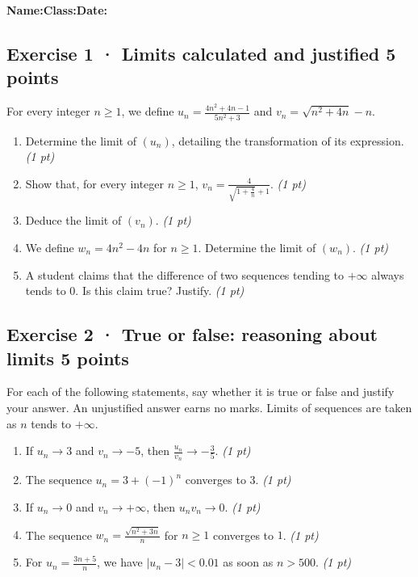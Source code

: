 \smallskip\textbf{Name:}\enspace\dotfill\quad\textbf{Class:}\enspace\dotfill\quad\textbf{Date:}\enspace\dotfill

\subsection*{Exercise 1 · Limits calculated and justified \hfill 5 points}For every integer $n\ge1$, we define $u_n=\frac{4n^2+4n-1}{5n^2+3}$ and $v_n=\sqrt{n^2+4n}-n$.

\begin{enumerate}

\item Determine the limit of $(u_n)$, detailing the transformation of its expression. \hfill\textit{(1 pt)}

\item Show that, for every integer $n\ge1$, $v_n=\frac{4}{\sqrt{1+\frac{4}n}+1}$. \hfill\textit{(1 pt)}

\item Deduce the limit of $(v_n)$. \hfill\textit{(1 pt)}

\item We define $w_n=4n^2-4n$ for $n\ge1$. Determine the limit of $(w_n)$. \hfill\textit{(1 pt)}

\item A student claims that the difference of two sequences tending to $+\infty$ always tends to $0$. Is this claim true? Justify. \hfill\textit{(1 pt)}

\end{enumerate}

\subsection*{Exercise 2 · True or false: reasoning about limits \hfill 5 points}For each of the following statements, say whether it is true or false and justify your answer. An unjustified answer earns no marks. Limits of sequences are taken as $n$ tends to $+\infty$.

\begin{enumerate}

\item If $u_n\to 3$ and $v_n\to-5$, then $\frac{u_n}{v_n}\to-\frac{3}{5}$. \hfill\textit{(1 pt)}

\item The sequence $u_n=3+(-1)^n$ converges to $3$. \hfill\textit{(1 pt)}

\item If $u_n\to0$ and $v_n\to+\infty$, then $u_nv_n\to0$. \hfill\textit{(1 pt)}

\item The sequence $w_n=\frac{\sqrt{n^2+3n}}{n}$ for $n\ge1$ converges to $1$. \hfill\textit{(1 pt)}

\item For $u_n=\frac{3n+5}{n}$, we have $|u_n-3|<\num{0,01}$ as soon as $n> 500$. \hfill\textit{(1 pt)}

\end{enumerate}

